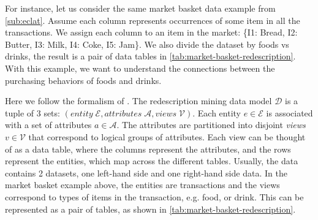 
For instance, let us consider the same market basket data example from \autoref{sub:eclat}.
Assume each column represents occurrences of some item in all the transactions.
We assign each column to an item in the market: \{I1: Bread, I2: Butter, I3: Milk, I4: Coke, I5: Jam\}.
We also divide the dataset by foods vs drinks, the result is a pair of data tables in \autoref{tab:market-basket-redescription}.
With this example, we want to understand the connections between the purchasing behaviors of foods and drinks.

Here we follow the formalism of \cite{Galbrun-Methods}.
The redescription mining data model $\mathcal{D}$ is a tuple of 3 sets: $\left( entity\;\mathcal{E}, attributes\;\mathcal{A}, views\;\mathcal{V} \right)$.
Each entity $e \in \mathcal{E}$ is associated with a set of attributes $a \in \mathcal{A}$.
The attributes are partitioned into disjoint \emph{views} $v \in \mathcal{V}$ that correspond to logical groups of attributes. Each view can be thought of as a data table, where the columns represent the attributes, and the rows represent the entities, which map across the different tables.
Usually, the data contains 2 datasets, one left-hand side and one right-hand side data.
In the market basket example above, the entities are transactions and the views correspond to types of items in the transaction, e.g. food, or drink.
This can be represented as a pair of tables, as shown in \autoref{tab:market-basket-redescription}.

